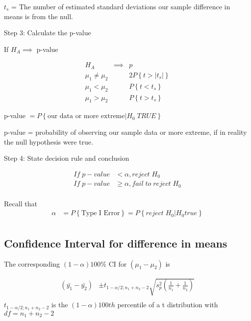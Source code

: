 \documentclass[10pt]{article}
\newcommand{\define}[1]{\colorbox{Thistle2}{#1}}
\newcommand{\mean}[1]{\mu_{#1}}
\newcommand{\svar}[1]{s^2_{#1}} %
\newcommand{\prob}[1]{P\left\{#1\right\}}
\begin{document}
\begin{multicols}{3}
    \define{$t_s$} = The number of estimated standard deviations our sample difference in means is from the null.

    Step 3: Calculate the p-value

    If $H_A \implies$ p-value

    \begin{align*}
        H_A                    & \implies & p                 \\
        \mean{1} \neq \mean{2} &          & 2\prob{t > |t_s|} \\
        \mean{1} < \mean{2}    &          & \prob{t < t_s}    \\
        \mean{1} > \mean{2}    &          & \prob{t > t_s}
    \end{align*}

    p-value $= \prob{\text{our data or more extreme} | H_0 \; TRUE}$

    \define{p-value} = probability of observing our sample data or more extreme, if in reality the null hypothesis were true.

    Step 4: State decision rule and conclusion

    \begin{align*}
        If \; p-value & < \alpha, reject \; H_0                \\
        If \; p-value & \geq \alpha, fail \;to\; reject \; H_0 \\
    \end{align*}

    Recall that
    \begin{align*}
        \alpha & = \prob{\text{Type I Error}} = \prob{reject \; H_0 | H_0 true} \\
    \end{align*}

    \subsection{Confidence Interval for difference in means}

    The corresponding $(1-\alpha)100\%$ CI for $(\mean{1} - \mean{2})$ is

    \begin{align*}
        (\bar{y_1} - \bar{y_2}) & \pm t_{1 - \alpha/2; n_1 + n_2 - 2} \sqrt{\svar{p}\left(\frac{1}{n_1} + \frac{1}{n_2}\right)} \\
    \end{align*}
    $t_{1 - \alpha/2; n_1 + n_2 - 2}$ is the $(1-\alpha)100th$ percentile of a t distribution with $df = n_1 + n_2 - 2$


\end{multicols}
\end{document}
